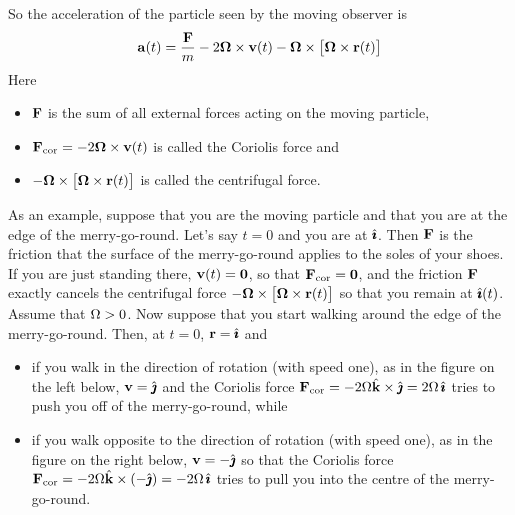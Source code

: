 So the acceleration of the particle seen by the moving observer is
\begin{align*}
\mathbf{a}(t) = \frac{\mathbf{F}}{m} -  2\mathbf{\Omega}\times\mathbf{v}(t)      
                     - \mathbf{\Omega}\times\big[\mathbf{\Omega}\times\mathbf{r}(t)\big]
\end{align*}
Here 
\begin{itemize}\itemsep1pt \parskip0pt 
\item 
   $\mathbf{F}$ is the sum of all external forces acting on the moving particle, 
\item 
   $\mathbf{F}_{{\rm cor}}=-2 \mathbf{\Omega}\times\mathbf{v}(t)$ is called the Coriolis force and
\item
   $ - \mathbf{\Omega}\times\big[\mathbf{\Omega}\times\mathbf{r}(t)\big]$ is called the centrifugal force.
\end{itemize}
As an example, suppose that you are the moving particle and that
you are at the edge of the merry-go-round. Let's say $t=0$ and you are
at $\hat{\pmb{\imath}}$. Then $\mathbf{F}$ is the friction that the surface of the merry-go-round 
applies to the soles of your shoes. If you are just standing there, 
$\mathbf{v}(t)=\mathbf{0}$, so that $\mathbf{F}_{{\rm cor}}=\mathbf{0}$, and the friction 
$\mathbf{F}$ exactly cancels the centrifugal force 
$-\mathbf{\Omega}\times\big[\mathbf{\Omega}\times\mathbf{r}(t)\big]$ 
so that you remain at $\hat{\pmb{\imath}}(t)$. Assume that $\Omega>0$. Now suppose that 
you start walking around the edge of the merry-go-round. Then, 
at $t=0$, $\mathbf{r}=\hat{\pmb{\imath}}$ and
\begin{itemize}\itemsep1pt \parskip0pt 
\item 
   if you walk in the direction of rotation (with speed one), as in the figure on the 
   left below, $\mathbf{v}=\hat{\pmb{\jmath}}$ and the Coriolis force $\mathbf{F}_{{\rm cor}}=
   -2\Omega\hat{\mathbf{k}}\times\hat{\pmb{\jmath}} = 2\Omega\,\hat{\pmb{\imath}}$ tries to push you off of 
   the merry-go-round, while
\item 
   if you walk opposite to the direction of rotation (with speed one), as in the figure 
   on the right below,  $\mathbf{v}=-\hat{\pmb{\jmath}}$ so that the Coriolis force 
   $\mathbf{F}_{{\rm cor}}=-2\Omega\hat{\mathbf{k}}\times(-\hat{\pmb{\jmath}}) = -2\Omega\,\hat{\pmb{\imath}}$ tries to pull you
   into the centre of the merry-go-round.
\end{itemize}
